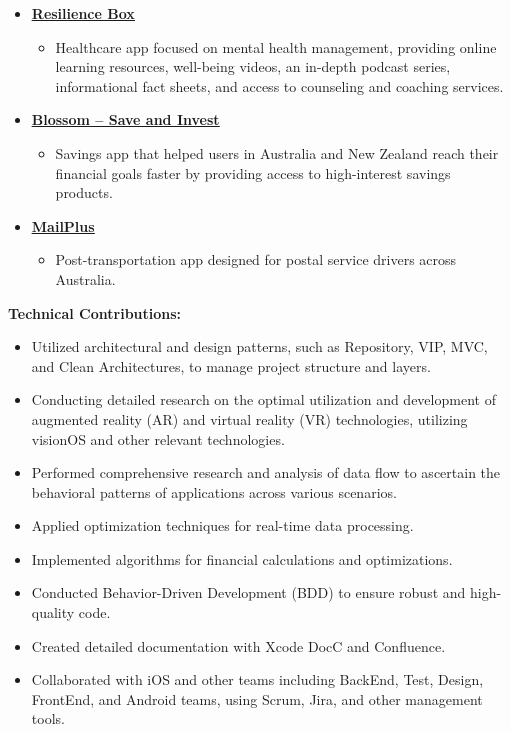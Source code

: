 \documentclass[letter,12pt]{article}
\newcommand{\customsquare}{\raisebox{0.25ex}{\scalebox{0.45}{$\blacksquare$}}}
\begin{document}
\begin{itemize}[label={\customsquare}]    
    \item \href{https://app.resiliencebox.com}{\underline{\textbf{Resilience Box}}}
    \begin{itemize}
        \item Healthcare app focused on mental health management, providing online learning resources, well-being videos, an in-depth podcast series, informational fact sheets, and access to counseling and coaching services.
    \end{itemize}

    \item \href{https://www.blossomapp.com}{\underline{\textbf{Blossom -- Save and Invest}}}
    \begin{itemize}
        \item Savings app that helped users in Australia and New Zealand reach their financial goals faster by providing access to high-interest savings products.
    \end{itemize}
    
    \item \href{https://mailplus.com.au}{\underline{\textbf{MailPlus}}}
    \begin{itemize}
        \item Post-transportation app designed for postal service drivers across Australia.
    \end{itemize}
\end{itemize}

\textbf{Technical Contributions:}
\begin{itemize}[label={\customsquare}]
    \item Utilized architectural and design patterns, such as Repository, VIP, MVC, and Clean Architectures, to manage project structure and layers.
    \item Conducting detailed research on the optimal utilization and development of augmented reality (AR) and virtual reality (VR) technologies, utilizing visionOS and other relevant technologies.
    \item Performed comprehensive research and analysis of data flow to ascertain the behavioral patterns of applications across various scenarios.
    \item Applied optimization techniques for real-time data processing.
    \item Implemented algorithms for financial calculations and optimizations.
    \item Conducted Behavior-Driven Development (BDD) to ensure robust and high-quality code.
    \item Created detailed documentation with Xcode DocC and Confluence.
    \item Collaborated with iOS and other teams including BackEnd, Test, Design, FrontEnd, and Android teams, using Scrum, Jira, and other management tools.
\end{itemize}
\end{document}
